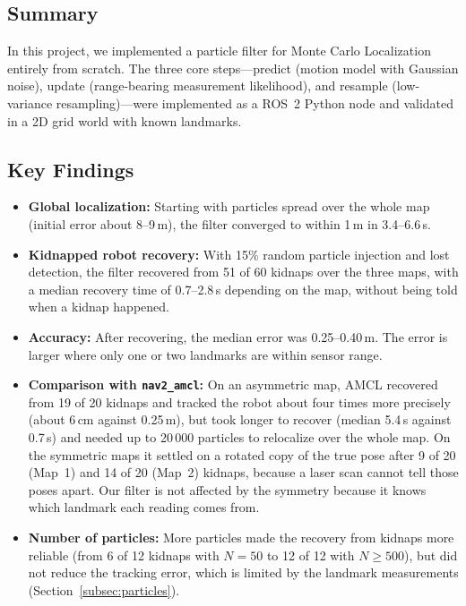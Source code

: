 \documentclass[12pt, a4paper]{article}
\begin{document}
\subsection{Summary}
In this project, we implemented a particle filter for Monte Carlo Localization entirely from scratch.  The three core steps---predict (motion model with Gaussian noise), update (range-bearing measurement likelihood), and resample (low-variance resampling)---were implemented as a ROS~2 Python node and validated in a 2D grid world with known landmarks.
\subsection{Key Findings}

\begin{itemize}
  \item \textbf{Global localization:} Starting with particles spread over the whole map (initial error about 8--9\,m), the filter converged to within 1\,m in 3.4--6.6\,s.

  \item \textbf{Kidnapped robot recovery:} With 15\% random particle injection and lost detection, the filter recovered from 51 of 60 kidnaps over the three maps, with a median recovery time of 0.7--2.8\,s depending on the map, without being told when a kidnap happened.

  \item \textbf{Accuracy:} After recovering, the median error was 0.25--0.40\,m.  The error is larger where only one or two landmarks are within sensor range.

  \item \textbf{Comparison with \texttt{nav2\_amcl}:} On an asymmetric map, AMCL recovered from 19 of 20 kidnaps and tracked the robot about four times more precisely (about 6\,cm against 0.25\,m), but took longer to recover (median 5.4\,s against 0.7\,s) and needed up to 20\,000 particles to relocalize over the whole map.  On the symmetric maps it settled on a rotated copy of the true pose after 9 of 20 (Map~1) and 14 of 20 (Map~2) kidnaps, because a laser scan cannot tell those poses apart.  Our filter is not affected by the symmetry because it knows which landmark each reading comes from.

  \item \textbf{Number of particles:} More particles made the recovery from kidnaps more reliable (from 6 of 12 kidnaps with \(N = 50\) to 12 of 12 with \(N \geq 500\)), but did not reduce the tracking error, which is limited by the landmark measurements (Section~\ref{subsec:particles}).
\end{itemize}
\end{document}
